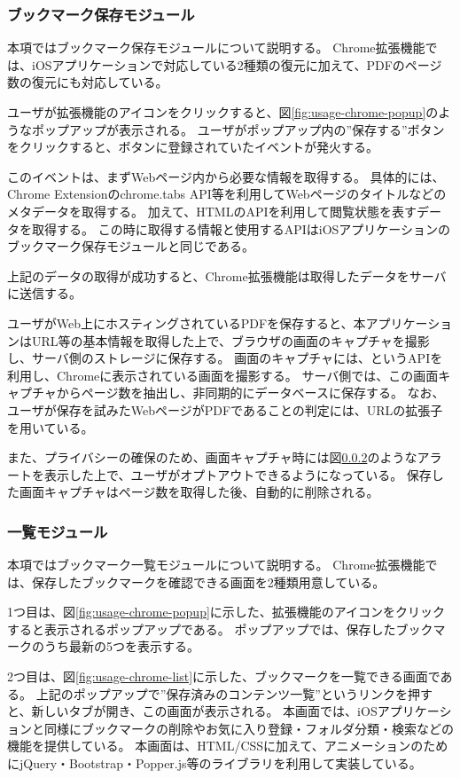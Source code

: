 \subsubsection{ブックマーク保存モジュール}
本項ではブックマーク保存モジュールについて説明する。
Chrome拡張機能では、iOSアプリケーションで対応している2種類の復元に加えて、PDFのページ数の復元にも対応している。

ユーザが拡張機能のアイコンをクリックすると、図\ref{fig:usage-chrome-popup}のようなポップアップが表示される。
ユーザがポップアップ内の”保存する”ボタンをクリックすると、ボタンに登録されていたイベントが発火する。

このイベントは、まずWebページ内から必要な情報を取得する。
具体的には、Chrome Extensionのchrome.tabs API等を利用してWebページのタイトルなどのメタデータを取得する。
加えて、HTMLのAPIを利用して閲覧状態を表すデータを取得する。
この時に取得する情報と使用するAPIはiOSアプリケーションのブックマーク保存モジュールと同じである。

上記のデータの取得が成功すると、Chrome拡張機能は取得したデータをサーバに送信する。

ユーザがWeb上にホスティングされているPDFを保存すると、本アプリケーションはURL等の基本情報を取得した上で、ブラウザの画面のキャプチャを撮影し、サーバ側のストレージに保存する。
画面のキャプチャには、というAPIを利用し、Chromeに表示されている画面を撮影する。
サーバ側では、この画面キャプチャからページ数を抽出し、非同期的にデータベースに保存する。
なお、ユーザが保存を試みたWebページがPDFであることの判定には、URLの拡張子を用いている。

また、プライバシーの確保のため、画面キャプチャ時には図\ref{}のようなアラートを表示した上で、ユーザがオプトアウトできるようになっている。
保存した画面キャプチャはページ数を取得した後、自動的に削除される。

\subsubsection{一覧モジュール}
本項ではブックマーク一覧モジュールについて説明する。
Chrome拡張機能では、保存したブックマークを確認できる画面を2種類用意している。

1つ目は、図\ref{fig:usage-chrome-popup}に示した、拡張機能のアイコンをクリックすると表示されるポップアップである。
ポップアップでは、保存したブックマークのうち最新の5つを表示する。

2つ目は、図\ref{fig:usage-chrome-list}に示した、ブックマークを一覧できる画面である。
上記のポップアップで”保存済みのコンテンツ一覧”というリンクを押すと、新しいタブが開き、この画面が表示される。
本画面では、iOSアプリケーションと同様にブックマークの削除やお気に入り登録・フォルダ分類・検索などの機能を提供している。
本画面は、HTML/CSSに加えて、アニメーションのためにjQuery\cite{jquery}・Bootstrap\cite{bootstrap}・Popper.js\cite{popper}等のライブラリを利用して実装している。


